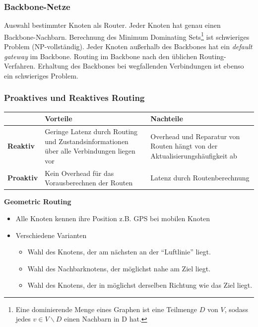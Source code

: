 \documentclass{article} %
\begin{document}
\subsubsection{Backbone-Netze}
Auswahl bestimmter Knoten als Router. Jeder Knoten hat
genau einen Backbone-Nachbarn.
Berechnung des Minimum Dominating Sets\footnote{Eine dominierende Menge eines Graphen ist eine Teilmenge $D$ von $V$, sodass jedes $v \in V \backslash D$ einen Nachbarn in D hat.} ist schwieriges Problem (NP-vollständig).
Jeder Knoten außerhalb des Backbones hat ein \emph{default gateway} im Backbone.
Routing im Backbone nach den üblichen Routing-Verfahren.
Erhaltung des Backbones bei wegfallenden Verbindungen ist ebenso ein schwieriges Problem.

\subsubsection{Proaktives und Reaktives Routing}
\begin{table}[h]
	\centering
	\label{tab:proaktiv-reaktiv}
	\begin{tabular}{|p{2cm}|p{6cm}|p{6cm}|}
		\hline
		& \textbf{Vorteile}                                                                        & \textbf{Nachteile}                                                           \\ \hline
		\textbf{Reaktiv}  & Geringe Latenz durch Routing und Zustandsinformationen über alle Verbindungen liegen vor & Overhead und Reparatur von Routen hängt von der Aktualisierungshäufigkeit ab \\ \hline
		\textbf{Proaktiv} & Kein Overhead für das Vorausberechnen der Routen                                         & Latenz durch Routenberechnung                                                \\ \hline
	\end{tabular}
\end{table}
\textbf{Geometric Routing}
\begin{itemize}
	\item Alle Knoten kennen ihre Position z.B. GPS bei mobilen Knoten
	\item Verschiedene Varianten
	\begin{itemize}
		\item 	Wahl des Knotens, der am nächsten an der "`Luftlinie"' liegt.
		\item Wahl des Nachbarknotens, der möglichst nahe am Ziel liegt.
		\item Wahl des Knotens, der in möglichst derselben Richtung wie das Ziel liegt.
	\end{itemize}

\end{itemize}
\end{document}
